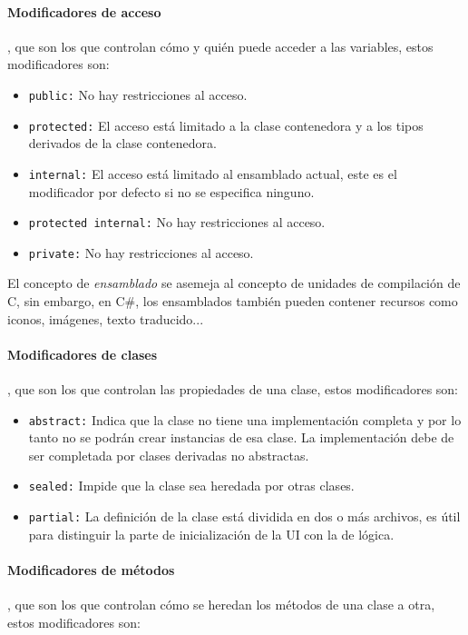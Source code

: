 \documentclass{pre-tfg}
\begin{document}
\paragraph{Modificadores de acceso}, que son los que controlan cómo y quién puede acceder a las variables, estos modificadores son:

\begin{itemize}
	\item \texttt{public:} No hay restricciones al acceso.
	\item \texttt{protected:} El acceso está limitado a la clase contenedora y a los tipos derivados de la clase contenedora.
	\item \texttt{internal:} El acceso está limitado al ensamblado actual, este es el modificador por defecto si no se especifica ninguno.
	\item \texttt{protected internal:} No hay restricciones al acceso.
	\item \texttt{private:} No hay restricciones al acceso.
\end{itemize}

El concepto de \emph{ensamblado} se asemeja al concepto de unidades de compilación de C, sin embargo, en C\#, los ensamblados también pueden contener recursos como iconos, imágenes, texto traducido...

\paragraph{Modificadores de clases}, que son los que controlan las propiedades de una clase, estos modificadores son:
\begin{itemize}
	\item \texttt{abstract:} Indica que la clase no tiene una implementación completa y por lo tanto no se podrán crear instancias de esa clase. La implementación debe de ser completada por clases derivadas no abstractas.
	\item \texttt{sealed:} Impide que la clase sea heredada por otras clases.
	\item \texttt{partial:} La definición de la clase está dividida en dos o más archivos, es útil para distinguir la parte de inicialización de la UI con la de lógica.
\end{itemize}

\paragraph{Modificadores de métodos}, que son los que controlan cómo se heredan los métodos de una clase a otra, estos modificadores son:
\end{document}

